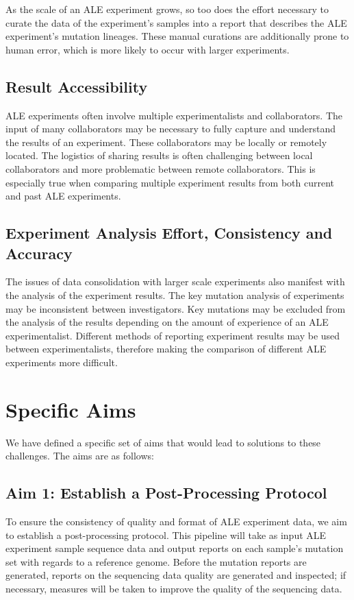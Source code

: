\documentclass[12pt,final,masters,chapterheads]{ucsd}  %
\begin{document}
As the scale of an ALE experiment grows, so too does the effort necessary to curate the data of the experiment's samples into a report that describes the ALE experiment's mutation lineages. These manual curations are additionally prone to human error, which is more likely to occur with larger experiments.

\subsection{Result Accessibility}

ALE experiments often involve multiple experimentalists and collaborators. The input of many collaborators may be necessary to fully capture and understand the results of an experiment. These collaborators may be locally or remotely located. The logistics of sharing results is often challenging between local collaborators and more problematic between remote collaborators. This is especially true when comparing multiple experiment results from both current and past ALE experiments.

\subsection{Experiment Analysis Effort, Consistency and Accuracy}

The issues of data consolidation with larger scale experiments also manifest with the analysis of the experiment results. The key mutation analysis of experiments may be inconsistent between investigators. Key mutations may be excluded from the analysis of the results depending on the amount of experience of an ALE experimentalist. Different methods of reporting experiment results may be used between experimentalists, therefore making the comparison of different ALE experiments more difficult.


\section{Specific Aims}

We have defined a specific set of aims that would lead to solutions to these challenges. The aims are as follows:
\subsection{Aim 1: Establish a Post-Processing Protocol}
To ensure the consistency of quality and format of ALE experiment data, we aim to establish a post-processing protocol. This pipeline will take as input ALE experiment sample sequence data and output reports on each sample's mutation set with regards to a reference genome. Before the mutation reports are generated, reports on the sequencing data quality are generated and inspected; if necessary, measures will be taken to improve the quality of the sequencing data.
\end{document}
